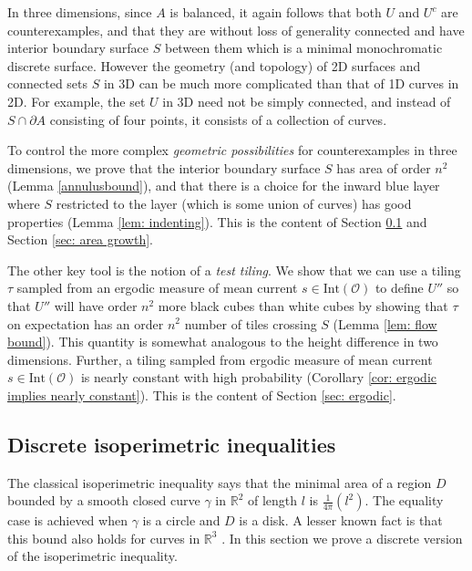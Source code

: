 \documentclass[11pt]{article}
\theoremstyle{remark}
\theoremstyle{definition}
\newcommand{\mc}[1]{\mathcal{#1}}
\begin{document}
In three dimensions, since $A$ is balanced, it again follows that both $U$ and $U^c$ are counterexamples, and that they are without loss of generality connected and have interior boundary surface $S$ between them which is a minimal monochromatic discrete surface. However the geometry (and topology) of 2D surfaces and connected sets $S$ in 3D can be much more complicated than that of 1D curves in 2D. For example, the set $U$ in 3D need not be simply connected, and instead of $S\cap \partial A$ consisting of four points, it consists of a collection of curves. 

To control the more complex \textit{geometric possibilities} for counterexamples in three dimensions, we prove that the interior boundary surface $S$ has area of order $n^2$ (Lemma \ref{annulusbound}), and that there is a choice for the inward blue layer where $S$ restricted to the layer (which is some union of curves) has good properties (Lemma \ref{lem: indenting}). This is the content of Section \ref{sec: isoperimetric} and Section \ref{sec: area growth}. 

The other key tool is the notion of a \textit{test tiling}. We show that we can use a tiling $\tau$ sampled from an ergodic measure of mean current $s\in \text{Int}(\mc O)$ to define $U''$ so that $U''$ will have order $n^2$ more black cubes than white cubes by showing that $\tau$ on expectation has an order $n^2$ number of tiles crossing $S$ (Lemma \ref{lem: flow bound}). This quantity is somewhat analogous to the height difference in two dimensions. Further, a tiling sampled from ergodic measure of mean current $s\in \text{Int}(\mc O)$ is nearly constant with high probability (Corollary \ref{cor: ergodic implies nearly constant}). This is the content of Section \ref{sec: ergodic}.



\subsection{Discrete isoperimetric inequalities}\label{sec: isoperimetric}

The classical isoperimetric inequality says that the minimal area of a region $D$ bounded by a smooth closed curve $\gamma$ in $\mathbb R^2$ of length $l$ is $\frac{1}{4\pi}(l^2)$. The equality case is achieved when $\gamma$ is a circle and $D$ is a disk. A lesser known fact is that this bound also holds for curves in $\mathbb R^3$ \cite{almgren1986optimal}. In this section we prove a discrete version of the isoperimetric inequality. 
\end{document}
